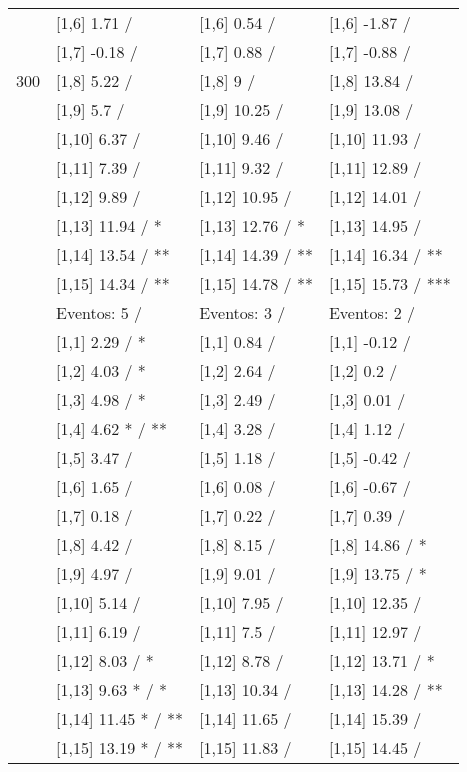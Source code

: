\begin{table}
\begin{tabular}[t]{llll}
 & {}[1,6] 1.71  / & {}[1,6] 0.54  / & {}[1,6] -1.87  /\\
 & {}[1,7] -0.18  / & {}[1,7] 0.88  / & {}[1,7] -0.88  /\\
300 & {}[1,8] 5.22  / & {}[1,8] 9  / & {}[1,8] 13.84  /\\
\addlinespace
 & {}[1,9] 5.7  / & {}[1,9] 10.25  / & {}[1,9] 13.08  /\\
 & {}[1,10] 6.37  / & {}[1,10] 9.46  / & {}[1,10] 11.93  /\\
 & {}[1,11] 7.39  / & {}[1,11] 9.32  / & {}[1,11] 12.89  /\\
 & {}[1,12] 9.89  / & {}[1,12] 10.95  / & {}[1,12] 14.01  /\\
 & {}[1,13] 11.94  / * & {}[1,13] 12.76  / * & {}[1,13] 14.95  /\\
\addlinespace
 & {}[1,14] 13.54  / ** & {}[1,14] 14.39  / ** & {}[1,14] 16.34  / **\\
 & {}[1,15] 14.34  / ** & {}[1,15] 14.78  / ** & {}[1,15] 15.73  / ***\\
 & Eventos:  5 / & Eventos:  3 / & Eventos:  2 /\\
 & {}[1,1] 2.29  / * & {}[1,1] 0.84  / & {}[1,1] -0.12  /\\
 & {}[1,2] 4.03  / * & {}[1,2] 2.64  / & {}[1,2] 0.2  /\\
\addlinespace
 & {}[1,3] 4.98  / * & {}[1,3] 2.49  / & {}[1,3] 0.01  /\\
 & {}[1,4] 4.62 * / ** & {}[1,4] 3.28  / & {}[1,4] 1.12  /\\
 & {}[1,5] 3.47  / & {}[1,5] 1.18  / & {}[1,5] -0.42  /\\
 & {}[1,6] 1.65  / & {}[1,6] 0.08  / & {}[1,6] -0.67  /\\
 & {}[1,7] 0.18  / & {}[1,7] 0.22  / & {}[1,7] 0.39  /\\
\addlinespace
500 & {}[1,8] 4.42  / & {}[1,8] 8.15  / & {}[1,8] 14.86  / *\\
 & {}[1,9] 4.97  / & {}[1,9] 9.01  / & {}[1,9] 13.75  / *\\
 & {}[1,10] 5.14  / & {}[1,10] 7.95  / & {}[1,10] 12.35  /\\
 & {}[1,11] 6.19  / & {}[1,11] 7.5  / & {}[1,11] 12.97  /\\
 & {}[1,12] 8.03  / * & {}[1,12] 8.78  / & {}[1,12] 13.71  / *\\
\addlinespace
 & {}[1,13] 9.63 * / * & {}[1,13] 10.34  / & {}[1,13] 14.28  / **\\
 & {}[1,14] 11.45 * / ** & {}[1,14] 11.65  / & {}[1,14] 15.39  /\\
 & {}[1,15] 13.19 * / ** & {}[1,15] 11.83  / & {}[1,15] 14.45  /\\
\bottomrule
\end{tabular}
\end{table}
